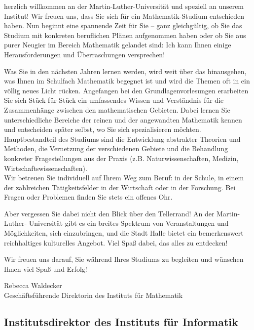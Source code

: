  herzlich willkommen an der Martin-Luther-Universität und speziell an
 unserem Institut! Wir freuen uns, dass Sie sich für ein
 Mathematik-Studium entschieden haben.
 Nun beginnt eine spannende Zeit für Sie -- ganz gleichgültig, ob Sie das
 Studium mit konkreten beruflichen Plänen aufgenommen haben oder ob Sie
 aus purer Neugier im Bereich Mathematik gelandet sind: Ich kann Ihnen
 einige Herausforderungen und Überraschungen versprechen!\par
 Was Sie in den nächsten Jahren lernen werden, wird weit über das
 hinausgehen, was Ihnen im Schulfach Mathematik begegnet ist und wird die
 Themen oft in ein völlig neues Licht rücken. Angefangen bei den
 Grundlagenvorlesungen erarbeiten Sie sich Stück für Stück ein
 umfassendes Wissen und Verständnis für die Zusammenhänge zwischen den
 mathematischen Gebieten. Dabei lernen Sie unterschiedliche Bereiche der
 reinen und der angewandten Mathematik kennen und entscheiden später
 selbst, wo Sie sich spezialisieren möchten. Hauptbestandteil des
 Studiums sind die Entwicklung abstrakter Theorien und Methoden, die
 Vernetzung der verschiedenen Gebiete und die Behandlung konkreter
 Fragestellungen aus der Praxis (z.B. Naturwissenschaften, Medizin,
 Wirtschaftswissenschaften).\\
 Wir betreuen Sie individuell auf Ihrem Weg zum Beruf: in der
 Schule, in einem der zahlreichen Tätigkeitsfelder in der Wirtschaft oder
 in der Forschung. Bei Fragen oder Problemen finden Sie stets ein offenes
 Ohr.\par
 
 Aber vergessen Sie dabei nicht den Blick über den Tellerrand! An der
 Martin-Luther- Universität gibt es ein breites Spektrum von
 Veranstaltungen und Möglichkeiten, sich einzubringen, und die Stadt
 Halle bietet ein bemerkenswert reichhaltiges kulturelles Angebot. Viel
 Spaß dabei, das alles zu entdecken! \par
 
 Wir freuen uns darauf, Sie während Ihres Studiums zu begleiten und
 wünschen Ihnen viel Spaß und Erfolg!\par
 
 Rebecca Waldecker \\
 Geschäftsführende Direktorin des Instituts für Mathematik

\newpage

\subsection{Institutsdirektor des Instituts für Informatik}

